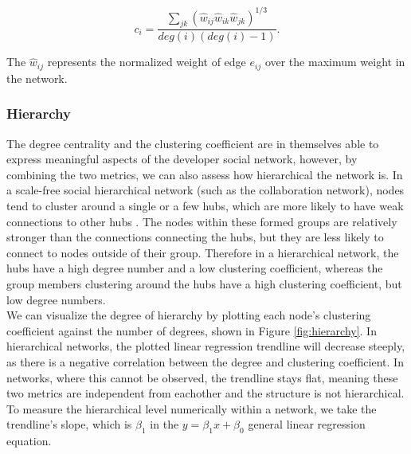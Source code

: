 \[ c_i = \frac{\sum_{jk}(\hat{w}_{ij}\hat{w}_{ik}\hat{w}_{jk})^{1/3}}{deg(i)(deg(i)-1)}. \]

The $\hat{w}_{ij}$ represents the normalized weight of edge $e_{ij}$ over the maximum weight in the network. \\

\subsubsection{Hierarchy}
The degree centrality and the clustering coefficient are in themselves able to express meaningful aspects of the developer social network, however, by combining the two metrics, we can also assess how hierarchical the network is. In a scale-free social hierarchical network (such as the collaboration network), nodes tend to cluster around a single or a few hubs, which are more likely to have weak connections to other hubs \cite{ravaszHierarchicalOrganizationComplex2003, joblinEvolutionaryTrendsDeveloper2017}. The nodes within these formed groups are relatively stronger than the connections connecting the hubs, but they are less likely to connect to nodes outside of their group. Therefore in a hierarchical network, the hubs have a high degree number and a low clustering coefficient, whereas the group members clustering around the hubs have a high clustering coefficient, but low degree numbers. \\

We can visualize the degree of hierarchy by plotting each node's  clustering coefficient against the number of degrees, shown in Figure \ref{fig:hierarchy}. In hierarchical networks, the plotted linear regression trendline will decrease steeply, as there is a negative correlation between the degree and clustering coefficient. In networks, where this cannot be observed, the trendline stays flat, meaning these two metrics are independent from eachother and the structure is not hierarchical. To measure the hierarchical level numerically within a network, we take the trendline's slope, which is $\beta_1$ in the $y=\beta_1x + \beta_0$ general linear regression equation. \\

